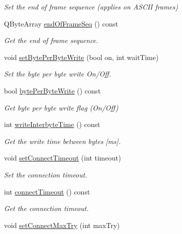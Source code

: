 \begin{DoxyCompactItemize}
\begin{DoxyCompactList}\small\item\em Set the end of frame sequence (applies on A\-S\-C\-I\-I frames) \end{DoxyCompactList}\item 
Q\-Byte\-Array \hyperlink{classmdt_port_config_a9ac77f89ee4a0baadc4814a9a95701b6}{end\-Of\-Frame\-Seq} () const 
\begin{DoxyCompactList}\small\item\em Get the end of frame sequence. \end{DoxyCompactList}\item 
void \hyperlink{classmdt_port_config_ac6cb3d8fbefad9a832335c3f2023832c}{set\-Byte\-Per\-Byte\-Write} (bool on, int wait\-Time)
\begin{DoxyCompactList}\small\item\em Set the byte per byte write On/\-Off. \end{DoxyCompactList}\item 
bool \hyperlink{classmdt_port_config_a9b5041ba740a5918e5e1323e61d3bbdc}{byte\-Per\-Byte\-Write} () const 
\begin{DoxyCompactList}\small\item\em Get byte per byte write flag (On/\-Off) \end{DoxyCompactList}\item 
int \hyperlink{classmdt_port_config_a76cc4a35cfd2c762d1f9dacb87203627}{write\-Interbyte\-Time} () const 
\begin{DoxyCompactList}\small\item\em Get the write time between bytes \mbox{[}ms\mbox{]}. \end{DoxyCompactList}\item 
void \hyperlink{classmdt_port_config_a64b8978cc32b97ffe64768fad6f2b0e8}{set\-Connect\-Timeout} (int timeout)
\begin{DoxyCompactList}\small\item\em Set the connection timeout. \end{DoxyCompactList}\item 
int \hyperlink{classmdt_port_config_a1e47b397318c6b4911d40dbbc5c317e7}{connect\-Timeout} () const 
\begin{DoxyCompactList}\small\item\em Get the connection timeout. \end{DoxyCompactList}\item 
void \hyperlink{classmdt_port_config_a1fed4cc77cc33193886e7562369eac88}{set\-Connect\-Max\-Try} (int max\-Try)

\end{DoxyCompactItemize}

